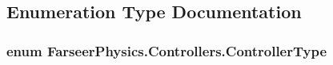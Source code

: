 \subsection{Enumeration Type Documentation}
\hypertarget{namespace_farseer_physics_1_1_controllers_a0b34b986191b1dd53a0a4169d1add7c7}{
\subsubsection[{Controller\+Type}]{\setlength{\rightskip}{0pt plus 5cm}enum {\bf Farseer\+Physics.\+Controllers.\+Controller\+Type}}}\label{namespace_farseer_physics_1_1_controllers_a0b34b986191b1dd53a0a4169d1add7c7}
